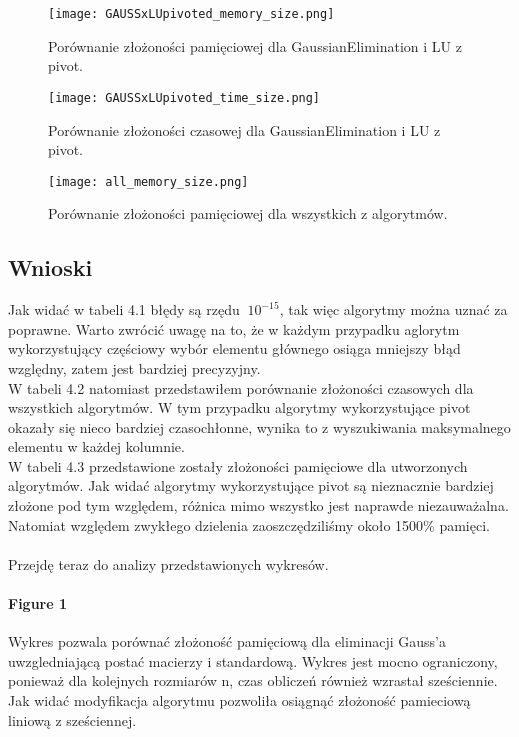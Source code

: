\documentclass[11pt]{article}
\begin{document}
\begin{flushleft}
\begin{figure}[H]
\begin{minipage}[b]{.45\textwidth}
  \end{minipage}
\end{figure}
\begin{figure}[H]
    \begin{minipage}[b]{.45\textwidth}
    \centering
    \texttt{[image: GAUSSxLUpivoted\_memory\_size.png]}
    \caption{Porównanie złożoności pamięciowej dla GaussianElimination i LU z pivot.}
  \end{minipage}\hfill
  \begin{minipage}[b]{.45\textwidth}
    \centering
    \texttt{[image: GAUSSxLUpivoted\_time\_size.png]}
    \caption{Porównanie złożoności czasowej dla GaussianElimination i LU z pivot.}
  \end{minipage}
  \centering
  \begin{minipage}[b]{.45\textwidth}
    \centering
    \texttt{[image: all\_memory\_size.png]}
    \caption{Porównanie złożoności pamięciowej dla wszystkich z algorytmów.}
  \end{minipage}
\end{figure}
\begin{flushleft}
\newpage
\section{Wnioski}
Jak widać w tabeli 4.1 błędy są rzędu $~ 10^{-15}$, tak więc algorytmy można uznać za poprawne.  Warto zwrócić uwagę na to, że w każdym przypadku aglorytm wykorzystujący częściowy wybór elementu głównego osiąga mniejszy błąd względny, zatem jest bardziej precyzyjny. 
\\
W tabeli 4.2 natomiast przedstawiłem porównanie złożoności czasowych dla wszystkich algorytmów. W tym przypadku algorytmy wykorzystujące pivot okazały się nieco bardziej czasochłonne, wynika to z wyszukiwania maksymalnego elementu w każdej kolumnie.
\\ W tabeli 4.3 przedstawione zostały złożoności pamięciowe dla utworzonych algorytmów. Jak widać algorytmy wykorzystujące pivot są nieznacznie bardziej złożone pod tym względem, różnica mimo wszystko jest naprawde niezauważalna. Natomiat względem zwykłego dzielenia zaoszczędziliśmy około 1500\% pamięci.\\\ 
\bigskip
\\
Przejdę teraz do analizy przedstawionych wykresów.

\paragraph{Figure 1}
Wykres pozwala porównać złożoność pamięciową dla eliminacji Gauss'a uwzgledniającą postać macierzy i standardową. Wykres jest mocno ograniczony, ponieważ dla kolejnych rozmiarów n, czas obliczeń również wzrastał sześciennie. Jak widać modyfikacja algorytmu pozwoliła osiągnąć złożoność pamieciową liniową z sześciennej.

\end{flushleft}
\end{flushleft}
\end{document}
